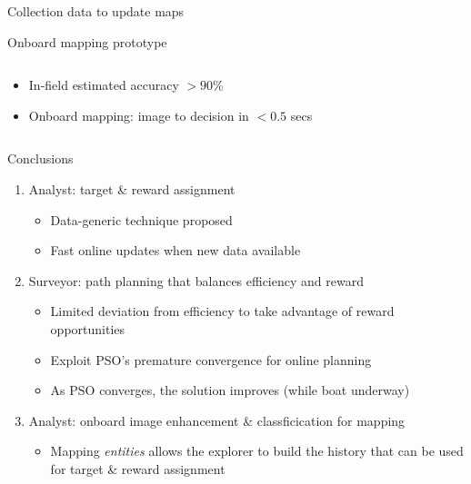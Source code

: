 \documentclass[9pt,xcolor=table]{beamer}
\begin{document}
\begin{frame}{Collection data to update maps}
\begin{block}{Onboard mapping prototype}
\begin{enumerate}
\begin{columns}
\begin{column}{0.7\textwidth}
\begin{itemize}
                    \item In-field estimated accuracy $>90\%$
                    \item Onboard mapping: image to decision in $<0.5$ secs
                \end{itemize}
            \end{column}
        \end{columns}  
        \end{enumerate}
    \end{block}
\end{frame}
\begin{frame}{Conclusions}
    \begin{enumerate}
        \item Analyst: target \& reward assignment
        \begin{itemize}
            \item Data-generic technique proposed
            \item Fast online updates when new data available
        \end{itemize}
        \item Surveyor: path planning that balances efficiency and reward
        \begin{itemize}
            \item Limited deviation from efficiency to take advantage of reward opportunities
            \item Exploit PSO's premature convergence for online planning
            \item As PSO converges, the solution improves (while boat underway)
        \end{itemize}
        \item Analyst: onboard image enhancement \& classficication for mapping
        \begin{itemize}
            \item Mapping \textit{entities} allows the explorer to build the history that can be used for target \& reward assignment
        \end{itemize}
    \end{enumerate}
\end{frame}
\end{document}
